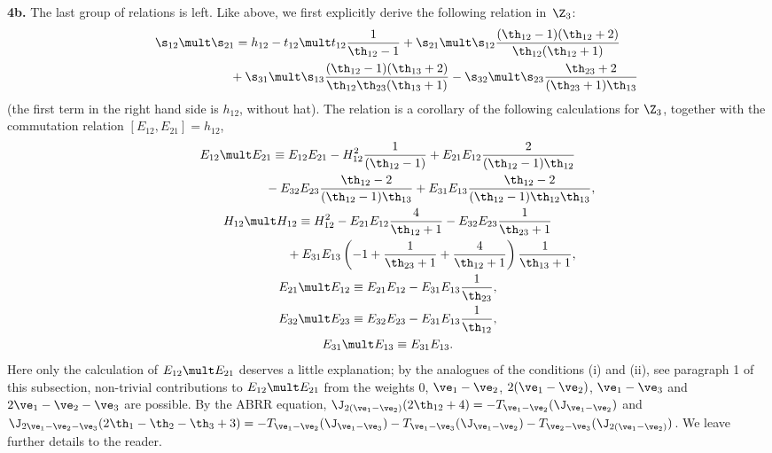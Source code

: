 {\bf 4b.} The last group  of relations is left. Like above, we f\/irst explicitly derive the following relation in~$\Z_3$:
\begin{gather} \s_{12}\mult \s_{21}=  h_{12}-t_{12}\mult t_{12}  \frac{1}{\th_{12}-1}+\s_{21}\mult\s_{12}
\frac{(\th_{12}-1)(\th_{12} +2)}{\th_{12}(\th_{12} +1)}\nonumber\\
\phantom{\s_{12}\mult \s_{21}=}{} +  \s_{31}\mult\s_{13} \frac{(\th_{12}-1) (\th_{13} +2)}{\th_{12}\th_{23}(\th_{13}+1)}
-\s_{32}\mult\s_{23}  \frac{\th_{23} +2}{(\th_{23} +1)\th_{13}}  \label{re01}
\end{gather}
(the f\/irst term in the right hand side is $h_{12}$, without hat). The relation  is a corollary of the following calculations
for $\Z_3$, together with the commutation relation $[E_{12},E_{21}]=h_{12}$,
\begin{gather}E_{12}\mult E_{21}\equiv   E_{12}E_{21}-H_{12}^2 \frac{1}{(\th_{12}-1)}
+E_{21}E_{12} \frac{2}{(\th_{12}-1)\th_{12}}\nonumber\\
\phantom{E_{12}\mult E_{21}\equiv}{} - E_{32}E_{23} \frac{\th_{12} -2}{(\th_{12}-1)\th_{13}}+
E_{31}E_{13} \frac{\th_{12} -2}{(\th_{12}-1)\th_{12}\th_{13}} ,\label{zemod1}\\
 H_{12}\mult H_{12}\equiv   H_{12}^2-E_{21}E_{12} \frac{4}{\th_{12} +1}
-E_{32}E_{23} \frac{1}{\th_{23} +1}\nonumber\\
\phantom{H_{12}\mult H_{12}\equiv}{} +  E_{31}E_{13}\left(-1+\frac{1}{\th_{23} +1}+\frac{4}{\th_{12} +1}\right)\frac{1}{\th_{13}+1} ,\label{zemod2}\\
E_{21}\mult E_{12}\equiv E_{21}E_{12}-E_{31}E_{13} \frac{1}{\th_{23}} ,\label{zemod3}\\
 E_{32}\mult E_{23}\equiv  E_{32}E_{23}-E_{31}E_{13} \frac{1}{\th_{12}} ,\label{zemod4}\\
 E_{31}\mult E_{13}\equiv  E_{31}E_{13} .\label{zemod5}
 \end{gather}
Here only the calculation of $E_{12}\mult E_{21}$ deserves a little explanation; by  the analogues of the conditions (i) and (ii),
see paragraph 1 of this subsection, non-trivial contributions to $E_{12}\mult E_{21}$ from the weights 0,
$\ve_1-\ve_2$, $2(\ve_1-\ve_2)$, $\ve_1-\ve_3$ and $2\ve_1-\ve_2-\ve_3$ are possible. By the ABRR equation,
$\J_{2(\ve_1-\ve_2)}(2\th_{12}+4)=-T_{\ve_1-\ve_2}(\J_{\ve_1-\ve_2})$ and $\J_{2\ve_1-\ve_2-\ve_3}
(2\th_1-\th_2-\th_3+3)=-T_{\ve_1-\ve_2}(\J_{\ve_1-\ve_3})-T_{\ve_1-\ve_3}(\J_{\ve_1-\ve_2})-T_{\ve_2-\ve_3}
(\J_{2(\ve_1-\ve_2)})$. We leave further details to the reader.


